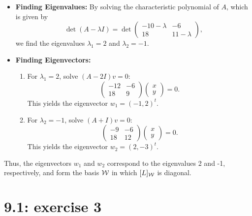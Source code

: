 \documentclass{report}
\begin{document}
\begin{itemize}
    \item \textbf{Finding Eigenvalues:} By solving the characteristic polynomial of $A$, which is given by
    \[
    \det(A - \lambda I) = \det\begin{pmatrix}
    -10 - \lambda & -6 \\
    18 & 11 - \lambda
    \end{pmatrix},
    \]
    we find the eigenvalues \(\lambda_1 = 2\) and \(\lambda_2 = -1\).
    
    \item \textbf{Finding Eigenvectors:}
    \begin{enumerate}
        \item For \(\lambda_1 = 2\), solve \( (A - 2I)v = 0 \):
        \[
        \begin{pmatrix}
        -12 & -6 \\
        18 & 9
        \end{pmatrix}
        \begin{pmatrix}
        x \\
        y
        \end{pmatrix} = 0.
        \]
        This yields the eigenvector \( w_1 = (-1, 2)^t \).
        
        \item For \(\lambda_2 = -1\), solve \( (A + I)v = 0 \):
        \[
        \begin{pmatrix}
        -9 & -6 \\
        18 & 12
        \end{pmatrix}
        \begin{pmatrix}
        x \\
        y
        \end{pmatrix} = 0.
        \]
        This yields the eigenvector \( w_2 = (2, -3)^t \).
    \end{enumerate}
\end{itemize}

Thus, the eigenvectors $w_1$ and $w_2$ correspond to the eigenvalues 2 and -1, respectively, and form the basis ${\cal W}$ in which $[L]_{\cal W}$ is diagonal.\\




\section*{9.1: exercise 3} 
\end{document}

